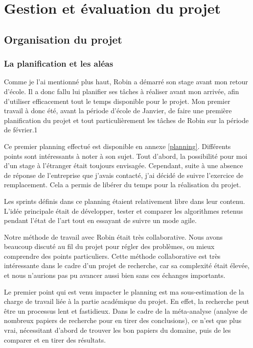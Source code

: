 \documentclass[openany, 11pt]{memoir}
\begin{document}
\newpage
\chapter{Gestion et évaluation du projet}

\section{Organisation du projet}

\subsection{La planification et les aléas}

Comme je l'ai mentionné plus haut, Robin a démarré son stage avant mon retour d'école. Il a donc fallu lui planifier ses tâches à réaliser avant mon arrivée, afin d'utiliser efficacement tout le temps disponible pour le projet. Mon premier travail à donc été, avant la période d'école de Janvier, de faire une première planification du projet et tout particulièrement les tâches de Robin sur la période de février.1

Ce premier planning effectué est disponible en annexe \ref{planning}. Différents points sont intéressants à noter à son sujet. Tout d'abord, la possibilité pour moi d'un stage à l'étranger était toujours envisagée. Cependant, suite à une absence de réponse de l'entreprise que j'avais contacté, j'ai décidé de suivre l'exercice de remplacement. Cela a permis de libérer du temps pour la réalisation du projet.

Les sprints définis dans ce planning étaient relativement libre dans leur contenu. L'idée principale était de développer, tester et comparer les algorithmes retenus pendant l'état de l'art tout en essayant de suivre un mode agile.

\bigskip
Notre méthode de travail avec Robin était très collaborative. Nous avons beaucoup discuté au fil du projet pour régler des problèmes, ou mieux comprendre des points particuliers. Cette méthode collaborative est très intéressante dans le cadre d'un projet de recherche, car sa complexité était élevée, et nous n'aurions pas pu avancer aussi bien sans ces échanges importants.

\bigskip
Le premier point qui est venu impacter le planning est ma sous-estimation de la charge de travail liée à la partie académique du projet. En effet, la recherche peut être un processus lent et fastidieux. Dans le cadre de la méta-analyse (analyse de nombreux papiers de recherche pour en tirer des conclusions), ce n'est que plus vrai, nécessitant d'abord de trouver les bon papiers du domaine, puis de les comparer et en tirer des résultats.
\end{document}
